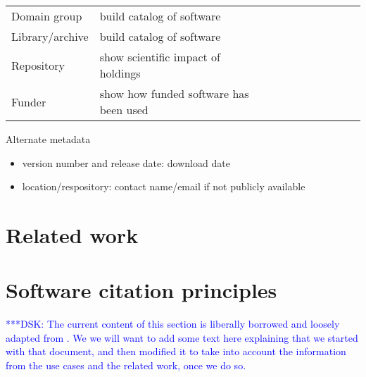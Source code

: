 \documentclass[11pt, oneside]{amsart}
\newcommand{\katznote}[1]{ {\textcolor{blue} { ***DSK: #1 }}}
\begin{document}
\begin{table}[htbp]
\begin{tabular}{@{}l l c c c c c c c c@{}}
Domain group & build catalog of software 			& \textbullet & \textbullet & \textbullet & \textbullet & \textbullet & \textbullet &  & \\
Library\slash archive & build catalog of software 	& \textbullet & \textbullet & \textbullet & \textbullet & \textbullet & \textbullet &  & \\
Repository & show scientific impact of holdings 	& \textbullet &   &   &   &   & \textbullet & \textbullet & \\
Funder & show how funded software has been used		& \textbullet &   &   &   &   & \textbullet & \textbullet & \\
\bottomrule
\end{tabular}
\label{tab:use_cases}
\end{table}%



Alternate metadata
\begin{itemize}
\item version number and release date: download date
\item location\slash respository: contact name\slash email if not publicly available
\end{itemize}




\section{Related work}
\label{sec:related_work}



\section{Software citation principles}
\label{sec:principles}

\katznote{The current content of this section is liberally borrowed and loosely adapted from \cite{data-citation-principles}.  We we will want to add some text here explaining that we started with that document, and then modified it to take into account the information from the use cases and the related work, once we do so.}
\end{document}
